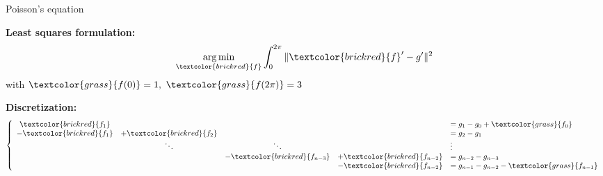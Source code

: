 \documentclass[UKenglish,aspectratio=169]{beamer}
\DeclareMathOperator*{\argmin}{arg\,min}
\newcommand\unknown[1]{\textcolor{brickred}{#1}}
\newcommand\known[1]{\textcolor{grass}{#1}}
\begin{document}
\begin{frame}{Poisson's equation}
\begin{minipage}[t]{.35\linewidth}
\strut\vspace*{-\baselineskip}\newline
\textbf{Least squares formulation:}
$$
\argmin\limits_{\unknown{f}} \int_0^{2\pi} \|\unknown{f}' - g'\|^2
$$
with $\known{f(0)}=1,~\known{f(2\pi)} = 3$
\end{minipage}
\pause
\qquad
\begin{minipage}[t]{.55\linewidth}
\strut\vspace*{-\baselineskip}\newline
\textbf{Discretization:}
$$
\left \{ \begin{array}{ccccl}
\unknown{f_1} &       &       &           & =  g_1 - g_0 + \known{f_0}  \\
-\unknown{f_1} & + \unknown{f_2} &       &           & = g_2 - g_1 \\
    &  \ddots     & \ddots      &     &       \vdots      \\
     &        &  -\unknown{f_{n-3}}     &  +\unknown{f_{n-2}}          & = g_{n-2} - g_{n-3} \\
     &        &       & - \unknown{f_{n-2}} & =  g_{n-1}-g_{n-2} -\known{f_{n-1}}
\end{array} \right.
$$
\end{minipage}

\pause
\inputminted[fontsize=\scriptsize,frame=single]{python}{listings/poisson-1d.py}
\end{frame}
\end{document}
